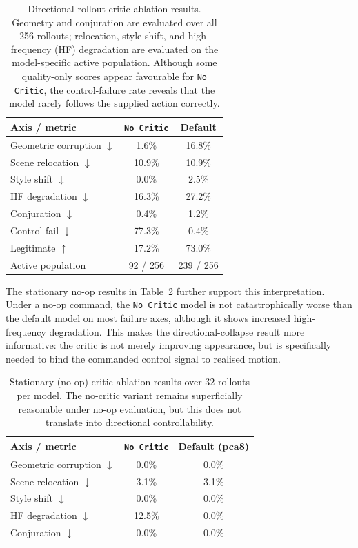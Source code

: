 \documentclass[letterpaper]{article} %
\begin{document}
\begin{table}[t]
\centering
\small
\setlength{\tabcolsep}{5pt}
\begin{tabular}{lcc}
\toprule
Axis / metric & \texttt{No Critic} & Default \\
\midrule
Geometric corruption $\downarrow$ & 1.6\%  & 16.8\% \\
Scene relocation $\downarrow$     & 10.9\% & 10.9\% \\
Style shift $\downarrow$          & 0.0\%  & 2.5\%  \\
HF degradation $\downarrow$       & 16.3\% & 27.2\% \\
Conjuration $\downarrow$          & 0.4\%  & 1.2\%  \\
\midrule
Control fail $\downarrow$         & 77.3\% & 0.4\%  \\
Legitimate $\uparrow$             & 17.2\% & 73.0\% \\
Active population                 & 92 / 256 & 239 / 256 \\
\bottomrule
\end{tabular}
\caption{
    Directional-rollout critic ablation results. Geometry and conjuration are
    evaluated over all 256 rollouts; relocation, style shift, and
    high-frequency (HF) degradation are evaluated on the model-specific active
    population. Although some quality-only scores appear favourable for
    \texttt{No Critic}, the control-failure rate reveals that the model rarely
    follows the supplied action correctly.
}
\label{tab:no_critic_directional}
\end{table}

The stationary no-op results in Table~\ref{tab:no_critic_stationary} further
support this interpretation. Under a no-op command, the \texttt{No Critic}
model is not catastrophically worse than the default model on most failure
axes, although it shows increased high-frequency degradation. This makes the directional-collapse result more
informative: the critic is not merely improving appearance, but is specifically
needed to bind the commanded control signal to realised motion.

\begin{table}[t]
\centering
\small
\setlength{\tabcolsep}{5pt}
\begin{tabular}{lcc}
\toprule
Axis / metric & \texttt{No Critic} & Default (pca8) \\
\midrule
Geometric corruption $\downarrow$ & 0.0\% & 0.0\% \\
Scene relocation $\downarrow$     & 3.1\% & 3.1\% \\
Style shift $\downarrow$          & 0.0\% & 0.0\% \\
HF degradation $\downarrow$       & 12.5\% & 0.0\% \\
Conjuration $\downarrow$          & 0.0\% & 0.0\% \\
\bottomrule
\end{tabular}
\caption{
    Stationary (no-op) critic ablation results over 32 rollouts per model. The no-critic variant remains superficially reasonable
    under no-op evaluation, but this does not translate into directional
    controllability.
}
\label{tab:no_critic_stationary}
\end{table}
\end{document}
